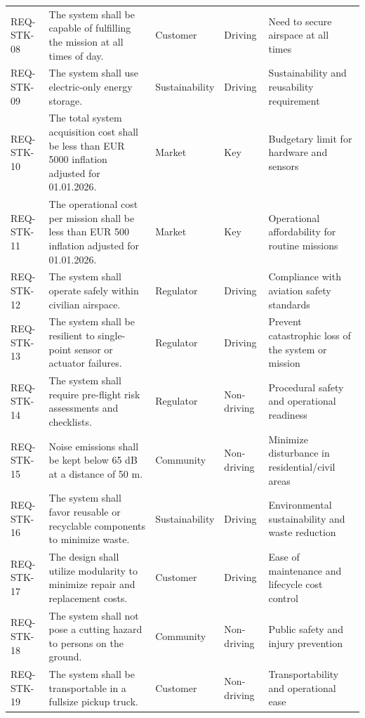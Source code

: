 \begin{xltabular}{\textwidth}{X p{0.3\textwidth} X X p{0.2\textwidth}}
REQ-STK-08  & The system shall be capable of fulfilling the mission at all times of day.                       & Customer             & Driving                 & Need to secure airspace at all times                   \\
REQ-STK-09  & The system shall use electric-only energy storage.                                               & Sustainability       & Driving                 & Sustainability and reusability requirement             \\
REQ-STK-10  & The total system acquisition cost shall be less than EUR 5000 inflation adjusted for 01.01.2026.  & Market               & Key                     & Budgetary limit for hardware and sensors                \\
REQ-STK-11  & The operational cost per mission shall be less than EUR 500 inflation adjusted for 01.01.2026.   & Market               & Key                     & Operational affordability for routine missions         \\
REQ-STK-12  & The system shall operate safely within civilian airspace.                                        & Regulator            & Driving             & Compliance with aviation safety standards              \\
REQ-STK-13  & The system shall be resilient to single-point sensor or actuator failures.                       & Regulator            & Driving                 & Prevent catastrophic loss of the system or mission     \\
REQ-STK-14  & The system shall require pre-flight risk assessments and checklists.                             & Regulator            & Non-driving             & Procedural safety and operational readiness            \\
REQ-STK-15  & Noise emissions shall be kept below 65 dB at a distance of 50 m.                                 & Community            & Non-driving             & Minimize disturbance in residential/civil areas        \\
REQ-STK-16  & The system shall favor reusable or recyclable components to minimize waste.                      & Sustainability       & Driving                 & Environmental sustainability and waste reduction       \\
REQ-STK-17  & The design shall utilize modularity to minimize repair and replacement costs.                    & Customer             & Driving                 & Ease of maintenance and lifecycle cost control          \\
REQ-STK-18  & The system shall not pose a cutting hazard to persons on the ground.                             & Community            & Non-driving             & Public safety and injury prevention                    \\
REQ-STK-19  & The system shall be transportable in a fullsize pickup truck.                                    & Customer             & Non-driving             & Transportability and operational ease                  \\ \hline
\end{xltabular}
\vspace{-25pt}

